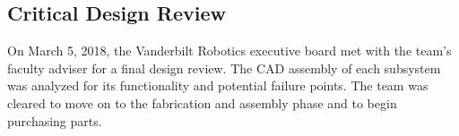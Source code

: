 \documentclass[class=article, crop=false]{standalone}
\begin{document}
	
	
	\subsection{Critical Design Review}
	
	On March 5, 2018, the Vanderbilt Robotics executive board met with the team’s faculty adviser for a final design review. The CAD assembly of each subsystem was analyzed for its functionality and potential failure points. The team was cleared to move on to the fabrication and assembly phase and to begin purchasing parts. 
	
	
	


	
\end{document}
